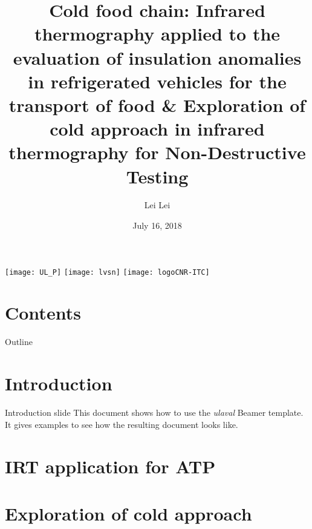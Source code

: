 \documentclass{beamer}
\title[Cold food chain-IRT application]{Cold food chain: Infrared thermography applied to the evaluation of insulation anomalies in refrigerated vehicles for the transport of food \& Exploration of cold approach in infrared thermography for Non-Destructive Testing}
\author[Lei Lei]{Lei Lei}
\institute[Université Laval]
{
	Electrical and Computer Engineering Department \\
	Laval University, Quebec City, Canada \\
	\medskip
}
\date{July 16, 2018} %
\begin{document}
\begin{frame}[label=titre, plain]
	\titlepage
	\begin{center}
		\texttt{[image: UL\_P]}%
		\hspace{1cm}
		\texttt{[image: lvsn]}
		\hspace{1cm}
		\texttt{[image: logoCNR-ITC]}
	\end{center}
\end{frame}


\section*{Contents}

\begin{frame}[label=toc]{Outline}
	\setlength{\leftskip}{5cm}%
	\tableofcontents[subsubsectionstyle=hide]
\end{frame}


\section{Introduction}


\begin{frame}[label=intro]{Introduction slide}
	This document shows how to use the \emph{ulaval} Beamer template.
	It gives examples to see how the resulting document looks like.
\end{frame}

\section{IRT application for ATP}




\section{Exploration of cold approach}





\end{document}
